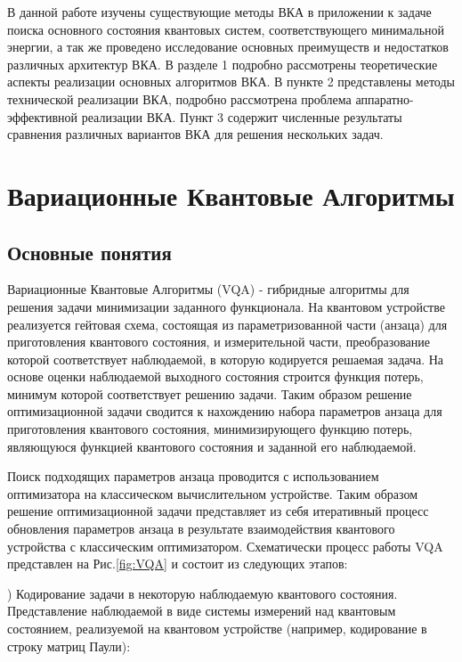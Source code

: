\documentclass[12pt]{extarticle}
\begin{document}
\qquad В данной работе изучены существующие методы ВКА в приложении к задаче поиска основного состояния квантовых систем, соответствующего минимальной энергии, а так же проведено исследование основных преимуществ и недостатков различных архитектур ВКА. В разделе 1 подробно рассмотрены теоретические аспекты реализации основных алгоритмов ВКА. В пункте 2 представлены методы технической реализации ВКА, подробно рассмотрена проблема аппаратно-эффективной реализации ВКА. Пункт 3 содержит численные результаты сравнения различных вариантов ВКА для решения нескольких задач.

\section{Вариационные Квантовые Алгоритмы}



\subsection{Основные понятия}

\qquad Вариационные Квантовые Алгоритмы (VQA) - гибридные алгоритмы для решения задачи минимизации заданного функционала. На квантовом устройстве реализуется гейтовая схема, состоящая из параметризованной части (анзаца) для приготовления квантового состояния, и  измерительной части, преобразование которой соответствует наблюдаемой, в которую кодируется решаемая задача. На основе оценки наблюдаемой выходного состояния строится функция потерь, минимум которой соответствует решению задачи. Таким образом решение оптимизационной задачи сводится к нахождению набора параметров анзаца для приготовления квантового состояния, минимизирующего функцию потерь, являющуюся функцией квантового состояния и заданной его наблюдаемой.

\qquad Поиск подходящих параметров анзаца проводится с использованием оптимизатора на классическом вычислительном устройстве. Таким образом решение оптимизационной задачи представляет из себя итеративный процесс обновления параметров анзаца в результате взаимодействия квантового устройства с классическим оптимизатором. Схематически процесс работы VQA представлен на Рис.\ref{fig:VQA} и состоит из следующих этапов:

) Кодирование задачи в некоторую наблюдаемую квантового состояния. Представление наблюдаемой в виде системы измерений над квантовым состоянием, реализуемой на квантовом устройстве (например, кодирование в строку матриц Паули):
\end{document}
